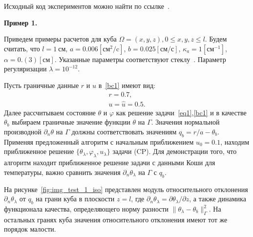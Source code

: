 \documentclass[12pt]{article}
\begin{document}
    Исходный код экспериментов можно найти по ссылке~\cite{mesenev-github}.

    \textbf{Пример 1.}

    Приведем примеры расчетов для куба $\Omega = {(x, y, z), 0 \leq x,y,z \leq l}$.
    Будем считать, что $l=1~\text{см}$, $a = 0.006[\text{см}^2/\text{c}]$,
    $b=0.025[\text{см}/\text{с}]$, $\kappa_a=1[\text{см}^{-1}]$, $\alpha = 0.(3)[\text{см}]$.
    Указанные параметры соответствуют стеклу~\cite{Grenkin5}.
    Параметр регуляризации $\lambda=10^{-12}.$

    Пусть граничные данные $r$ и $u$ в~\eqref{bc1} имеют вид:
    \begin{gather*}
        r = 0.7,\\
        u = \hat u = 0.5.
    \end{gather*}
    Далее рассчитываем состояние $\theta$ и $\varphi$ как решение
    задачи~\eqref{eq1},\eqref{bc1} и в качестве $\theta_b$ выбираем
    граничные значение функции $\theta$ на $\Gamma$.
    Значения нормальной производной $\partial_n\theta$ на $\Gamma$
    должны соответствовать значениям $q_b=r/a-\theta_b$.
    Применяя предложенный алгоритм с начальным приближением $u_0 = 0.1$, находим приближенное решение
    $\{\theta_\lambda, \varphi_\lambda, u_\lambda\}$ задачи (CP).
    Для демонстрации того, что алгоритм находит приближенное решение задачи с данными
    Коши для температуры, важно сравнить значения $\partial_n\theta_\lambda$ на $\Gamma$ с $q_b.$

    На рисунке~\ref{fig:img_test_1_iso} представлен модуль относительного
    отклонения $\partial_n\theta_\lambda$ от $q_b$ на грани куба в плоскости $z=l$,
    где $\partial_n\theta_\lambda=\partial\theta_\lambda/\partial z$,
    а также динамика функционала качества, определяющего норму
    разности $\|\theta_\lambda -\theta_b\|^2_\Gamma$.
    На остальных гранях куба значения относительного отклонения имеют тот же порядок малости.
\end{document}
